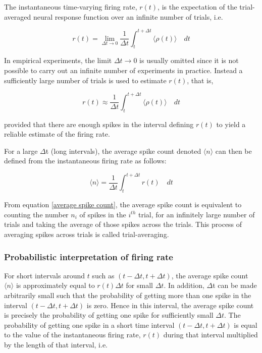 The instantaneous time-varying firing rate, $r(t)$, is the expectation of the 
trial-averaged neural response function over an infinite number of trials, i.e.

\begin{equation} \label{expected FireRate}
r(t) = \displaystyle  \lim_{\Delta t \rightarrow 0}    \frac{1}{\Delta t}  \int_{t}^{t+\Delta t} 
 \langle \rho(t) \rangle \quad dt 
\end{equation}


In empirical experiments, the limit ${\Delta t \rightarrow 0}$ is usually
omitted since it is not possible to carry out an infinite number of experiments
in practice. Instead a sufficiently large number of trials is used
to estimate $r(t)$, that is,

\[ 
r(t) \approx  \displaystyle  \frac{1}{\Delta t}  \int_{t}^{t+\Delta t} 
 \langle \rho(t) \rangle \quad dt 
\]

provided that there are enough spikes in the interval defining $r(t)$
to yield a reliable estimate of the firing rate.

For a large $\Delta$t (long intervals), the average spike count denoted $\langle n  \rangle$ can then be  defined from the instantaneous firing rate as follows:

\begin{equation}\label{average spike count}
\langle n \rangle =  \displaystyle  \frac{1}{\Delta t}  
\int_{t}^{t+\Delta t}  r(t)  \quad dt 
\end{equation}

From equation \eqref{average spike count}, the average spike count is equivalent
to counting the number $n_{i}$  of spikes in the $i^{th}$ trial, for an infinitely large number of trials and taking the average of those spikes across the trials. This process of averaging spikes across trials is called trial-averaging.

\subsubsection{Probabilistic interpretation of firing rate}
For short intervals around $t$ such as $(t-\Delta t, t+\Delta t)$, the average spike count    $\langle n \rangle$ is approximately equal 
to $r(t) \Delta t$ for small $\Delta t$.
In addition, $\Delta$t can be made arbitrarily small such that
the probability of getting more than one spike in the interval
 $(t-\Delta t, t+\Delta t)$ is zero. 
Hence in this interval, the average spike count is precisely the probability of getting one spike for sufficiently small $\Delta t$.
The probability of getting one spike in a short time interval  $(t-\Delta t, t+\Delta t)$ is equal to the value of the instantaneous firing rate, $r(t)$ during that interval multiplied by the length of that interval, i.e.


